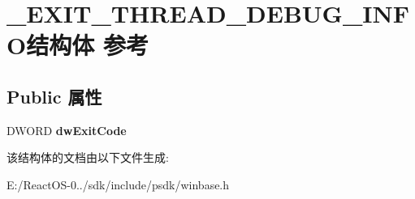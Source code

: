 \hypertarget{struct___e_x_i_t___t_h_r_e_a_d___d_e_b_u_g___i_n_f_o}{}\section{\+\_\+\+E\+X\+I\+T\+\_\+\+T\+H\+R\+E\+A\+D\+\_\+\+D\+E\+B\+U\+G\+\_\+\+I\+N\+F\+O结构体 参考}
\label{struct___e_x_i_t___t_h_r_e_a_d___d_e_b_u_g___i_n_f_o}
\subsection*{Public 属性}
\begin{DoxyCompactItemize}
\item 
\mbox{\label{struct___e_x_i_t___t_h_r_e_a_d___d_e_b_u_g___i_n_f_o_a1bccbd94597ea6870f7f4d54e8a7a762}} 
D\+W\+O\+RD {\bfseries dw\+Exit\+Code}
\end{DoxyCompactItemize}


该结构体的文档由以下文件生成\+:\begin{DoxyCompactItemize}
\item 
E\+:/\+React\+O\+S-\/0../sdk/include/psdk/winbase.\+h\end{DoxyCompactItemize}

